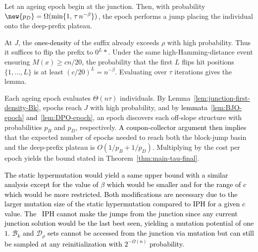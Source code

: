 \begin{lemma} \label{lem:DPO-epoch}
	Let an ageing epoch begin at the junction.
	Then, with probability $\new{p_D}=\Omega(\min\{1,\,\tau\,n^{-\beta}\})$, the epoch performs a jump placing the individual onto the deep-prefix plateau.
\end{lemma}

At $J$, the \textcolor{black}{ones-density} of the suffix already exceeds $\rho$ with high probability.
Thus it suffices to flip the prefix to $0^L *$.
Under the same high-Hamming-distance event ensuring $M(x)\ge cn/20$, the probability that the first $L$ flips hit positions $\{1,\dots,L\}$ is at least $(c/20)^L = n^{-\beta}$.
Evaluating over $\tau$ iterations gives the lemma.

Each ageing epoch evaluates $\Theta(n\tau)$ individuals.
By Lemma~\ref{lem:junction-first-density-Bk}, epochs reach $J$ with high probability, and by \textcolor{black}{lemmata~\ref{lem:BJO-epoch} and~\ref{lem:DPO-epoch}}, an epoch discovers each off-slope structure with probabilities $p_B$ and $p_D$, respectively.
\textcolor{black}{A coupon-collector argument then implies} that the expected number of epochs needed to reach both the block-jump basin and the deep-prefix plateau is $O(1/p_B + 1/p_D)$.
Multiplying by the cost per epoch yields the bound stated in Theorem~\ref{thm:main-tau-final}.

\textcolor{black}{The static hypermutation would yield a same upper bound with a similar analysis except for the value of $\beta$ which would be smaller and for the range of $c$ which would be more restricted. Both modifications are necessary due to the larger mutation size of the static hypermutation compared to IPH for a given $c$ value. The \lastBest~IPH cannot make the jumps from the junction since any current junction solution would be the last best seen, yielding a mutation potential of one $1$. $\mathcal{B}_k$ and $\mathcal{D}_\rho$ sets cannot be accessed from the junction via mutation but can still be sampled at any reinitialization with $2^{-\Omega(n)}$ probability.}
